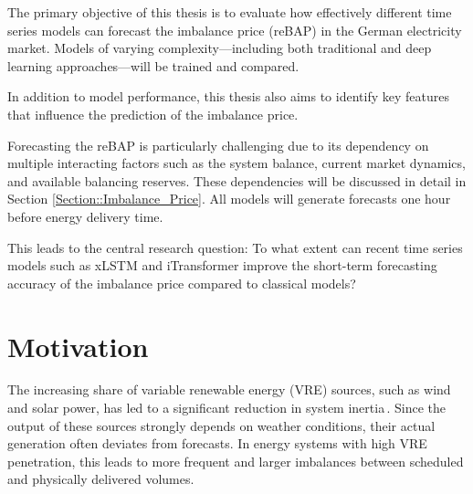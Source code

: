 \documentclass[class=scrbook, crop=false]{standalone}
\begin{document}

The primary objective of this thesis is to evaluate how effectively different time series models can forecast the imbalance price (reBAP) in the German electricity market. Models of varying complexity—including both traditional and deep learning approaches—will be trained and compared.

In addition to model performance, this thesis also aims to identify key features that influence the prediction of the imbalance price.

Forecasting the reBAP is particularly challenging due to its dependency on multiple interacting factors such as the system balance, current market dynamics, and available balancing reserves. These dependencies will be discussed in detail in Section \ref{Section::Imbalance_Price}. All models will generate forecasts one hour before energy delivery time.

This leads to the central research question: To what extent can recent time series models such as xLSTM and iTransformer improve the short-term forecasting accuracy of the imbalance price compared to classical models?
\section{Motivation}
\label{Section::Motivation}


The increasing share of variable renewable energy (VRE) sources, such as wind and solar power, has led to a significant reduction in system inertia \cite{weitemeyerIntegrationRenewableEnergy2015}. Since the output of these sources strongly depends on weather conditions, their actual generation often deviates from forecasts. In energy systems with high VRE penetration, this leads to more frequent and larger imbalances between scheduled and physically delivered volumes.
\end{document}

